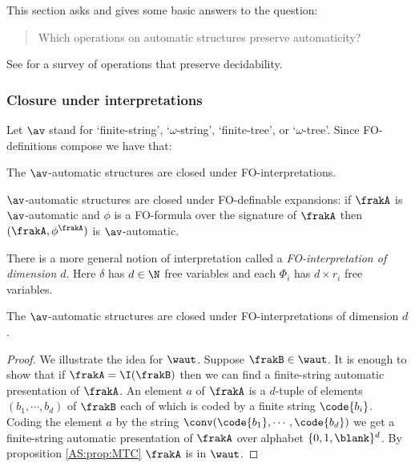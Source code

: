 This section asks and gives some basic answers to the question:
\begin{quote}
Which operations on automatic structures preserve automaticity?
\end{quote}
 See \cite{BCL07} for a survey of operations that preserve decidability.
 
\subsubsection*{Closure under interpretations}
Let $\av$ stand for `finite-string', `$\omega$-string', `finite-tree', or `$\omega$-tree'.
Since FO-definitions compose we have that:
\begin{proposition} \cite{Blum99}
The $\av$-automatic structures are closed under FO-interpretations.
\end{proposition}

\begin{example}
$\av$-automatic structures are closed under FO-definable expansions: if $\frakA$ is $\av$-automatic and $\phi$ is a FO-formula over the signature of $\frakA$ then $(\frakA,\phi^\frakA)$ is $\av$-automatic.
\end{example}

There is a more general notion of interpretation called a {\em FO-interpretation of dimension $d$}.
Here $\delta$ has $d \in \N$ free variables and each $\Phi_i$ has $d\times r_i$ free variables.

\begin{proposition} \cite{BlGr00}
The $\av$-automatic structures are closed under  FO-interpretations of dimension $d$.
\end{proposition}

\begin{proof}
We illustrate the idea for $\waut$. Suppose $\frakB \in \waut$. It is enough to show that if $\frakA = \I(\frakB)$ then we can find a finite-string automatic presentation of $\frakA$. 
An element $a$ of $\frakA$ is a $d$-tuple of elements $(b_1,\cdots,b_d)$ of $\frakB$ each of which is coded by a finite string 
$\code{b_i}$. Coding the element $a$ by the string $\conv(\code{b_1},\cdots,\code{b_d})$ we get a finite-string automatic presentation of $\frakA$ over alphabet 
$\{0,1,\blank\}^d$. By proposition \ref{AS:prop:MTC} $\frakA$ is in $\waut$.
\end{proof}

